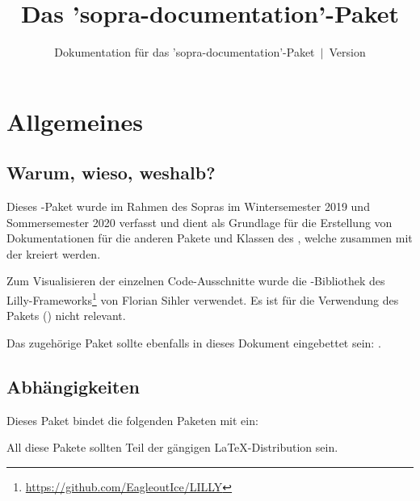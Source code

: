 \documentclass{sopra-base}
\title{Das 'sopra-documentation'-Paket}
\subtitle[Dokumentation für das 'sopra-documentation'-Paket]{Dokumentation für das 'sopra-documentation'-Paket~$\mid$~Version \thesodversion}
\begin{document}
    \maketitle%
%
%

%
%
%
%

\section{Allgemeines}
\subsection{Warum, wieso, weshalb?}
    Dieses \LaTeXe-Paket wurde im Rahmen des Sopras im 
    Wintersemester 2019 und Sommersemester 2020 verfasst und dient als
    Grundlage für die Erstellung von Dokumentationen für die anderen Pakete und Klassen
    des , welche zusammen mit der  kreiert
    werden.\par
    Zum Visualisieren der einzelnen Code-Ausschnitte wurde die 
    -Bibliothek des Lilly-Frameworks\footnote{\url{https://github.com/EagleoutIce/LILLY}} von
    Florian Sihler verwendet. Es ist für die Verwendung des Pakets ()
    nicht relevant.\par
    Das zugehörige Paket sollte ebenfalls in dieses Dokument eingebettet sein: .
\subsection{Abhängigkeiten}
    Dieses Paket bindet die folgenden Paketen mit ein:
    \begin{multicols}{3}
    \end{multicols}
    All diese Pakete sollten Teil der gängigen \LaTeX-Distribution sein.
\end{document}
